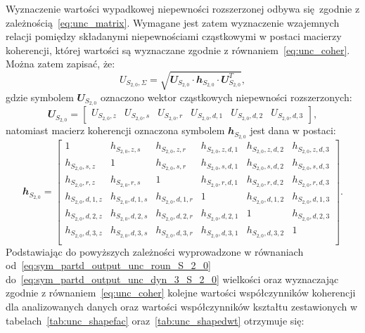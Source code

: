 Wyznaczenie wartości wypadkowej niepewności rozszerzonej odbywa się zgodnie z zależnością~\eqref{eq:unc_matrix}. Wymagane jest zatem wyznaczenie wzajemnych relacji pomiędzy składanymi niepewnościami cząstkowymi w postaci macierzy koherencji, której wartości są wyznaczane zgodnie z równaniem~\eqref{eq:unc_coher}. Można zatem zapisać, że:
\begin{equation}
U_{S_{2,0},\Sigma} = \sqrt{\mathbfit{U}_{S_{2,0}} \cdot \mathbfit{h}_{S_{2,0}} \cdot \mathbfit{U}_{S_{2,0}}^{T}} \label{eq:sym_partd_output_unc_summul_S_2_0},
\end{equation}
gdzie symbolem $\mathbfit{U}_{S_{2,0}}$ oznaczono wektor cząstkowych niepewności rozszerzonych:
\begin{equation}
\mathbfit{U}_{S_{2,0}} =
\begin{bmatrix}
U_{S_{2,0},z} & U_{S_{2,0},s} & U_{S_{2,0},r} & U_{S_{2,0},d,1} & U_{S_{2,0},d,2} & U_{S_{2,0},d,3}
\end{bmatrix}
\label{eq:sym_partd_output_unc_sumuvect_S_2_0_a},
\end{equation}
natomiast macierz koherencji oznaczona symbolem $\mathbfit{h}_{S_{2,0}}$ jest dana w postaci:
\begin{equation}
\mathbfit{h}_{S_{2,0}} =
\begin{bmatrix}
1                 & h_{S_{2,0},z,s}   & h_{S_{2,0},z,r}   & h_{S_{2,0},z,d,1} & h_{S_{2,0},z,d,2} & h_{S_{2,0},z,d,3} \\
h_{S_{2,0},s,z}   & 1                 & h_{S_{2,0},s,r}   & h_{S_{2,0},s,d,1} & h_{S_{2,0},s,d,2} & h_{S_{2,0},s,d,3} \\
h_{S_{2,0},r,z}   & h_{S_{2,0},r,s}   & 1                 & h_{S_{2,0},r,d,1} & h_{S_{2,0},r,d,2} & h_{S_{2,0},r,d,3} \\
h_{S_{2,0},d,1,z} & h_{S_{2,0},d,1,s} & h_{S_{2,0},d,1,r} & 1                 & h_{S_{2,0},d,1,2} & h_{S_{2,0},d,1,3} \\
h_{S_{2,0},d,2,z} & h_{S_{2,0},d,2,s} & h_{S_{2,0},d,2,r} & h_{S_{2,0},d,2,1} & 1                 & h_{S_{2,0},d,2,3} \\
h_{S_{2,0},d,3,z} & h_{S_{2,0},d,3,s} & h_{S_{2,0},d,3,r} & h_{S_{2,0},d,3,1} & h_{S_{2,0},d,3,2} & 1                 \\
\end{bmatrix}
\label{eq:sym_partd_output_unc_sumcoher_S_2_0}.
\end{equation}
Podstawiając do powyższych zależności wyprowadzone w równaniach od~\eqref{eq:sym_partd_output_unc_roun_S_2_0} do~\eqref{eq:sym_partd_output_unc_dyn_3_S_2_0} wielkości oraz wyznaczając zgodnie z równaniem~\eqref{eq:unc_coher} kolejne wartości współczynników koherencji dla analizowanych danych oraz wartości współczynników kształtu zestawionych w tabelach~\ref{tab:unc_shapefac} oraz~\ref{tab:unc_shapedwt} otrzymuje się:
